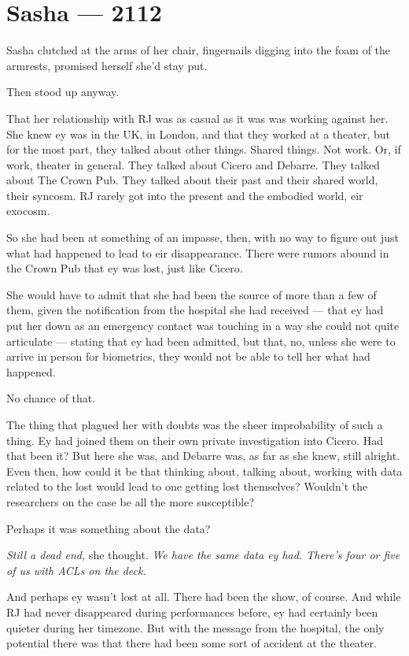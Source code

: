 \hypertarget{sasha-2112}{%
\chapter*{Sasha — 2112}\label{sasha-2112}}

Sasha clutched at the arms of her chair, fingernails digging into the foam of the armrests, promised herself she'd stay put.

Then stood up anyway.

That her relationship with RJ was as casual as it was was working against her. She knew ey was in the UK, in London, and that they worked at a theater, but for the most part, they talked about other things. Shared things. Not work. Or, if work, theater in general. They talked about Cicero and Debarre. They talked about The Crown Pub. They talked about their past and their shared world, their syncosm. RJ rarely got into the present and the embodied world, eir exocosm.

So she had been at something of an impasse, then, with no way to figure out just what had happened to lead to eir disappearance. There were rumors abound in the Crown Pub that ey was lost, just like Cicero.

She would have to admit that she had been the source of more than a few of them, given the notification from the hospital she had received — that ey had put her down as an emergency contact was touching in a way she could not quite articulate — stating that ey had been admitted, but that, no, unless she were to arrive in person for biometrics, they would not be able to tell her what had happened.

No chance of that.

The thing that plagued her with doubts was the sheer improbability of such a thing. Ey had joined them on their own private investigation into Cicero. Had that been it? But here she was, and Debarre was, as far as she knew, still alright. Even then, how could it be that thinking about, talking about, working with data related to the lost would lead to one getting lost themselves? Wouldn't the researchers on the case be all the more susceptible?

Perhaps it was something about the data?

\emph{Still a dead end,} she thought. \emph{We have the same data ey had. There's four or five of us with ACLs on the deck.}

And perhaps ey wasn't lost at all. There had been the show, of course. And while RJ had never disappeared during performances before, ey had certainly been quieter during her timezone. But with the message from the hospital, the only potential there was that there had been some sort of accident at the theater.

